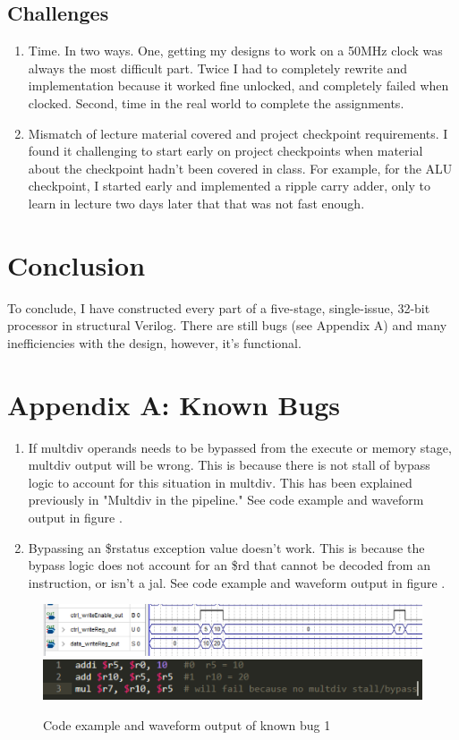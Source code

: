 \documentclass[letterpaper]{article}
\begin{document}
\subsection{Challenges}
\begin{enumerate}
    \item Time. In two ways. One, getting my designs to work on a 50MHz clock was always the most difficult part. Twice I had to completely rewrite and implementation because it worked fine unlocked, and completely failed when clocked. Second, time in the real world to complete the assignments.
    \item Mismatch of lecture material covered and project checkpoint requirements. I found it challenging to start early on project checkpoints when material about the checkpoint hadn't been covered in class. For example, for the ALU checkpoint, I started early and implemented a ripple carry adder, only to learn in lecture two days later that that was not fast enough.
\end{enumerate}

\section{Conclusion}
To conclude, I have constructed every part of a five-stage, single-issue, 32-bit processor in structural Verilog. There are still bugs (see Appendix A) and many inefficiencies with the design, however, it's functional.

\clearpage

\section{Appendix A: Known Bugs}
\begin{enumerate}
    \item If multdiv operands needs to be bypassed from the execute or memory stage, multdiv output will be wrong. This is because there is not stall of bypass logic to account for this situation in multdiv. This has been explained previously in "Multdiv in the pipeline." See code example and waveform output in figure .
    \item Bypassing an \$rstatus exception value doesn't work. This is because the bypass logic does not account for an \$rd that cannot be decoded from an instruction, or isn't a jal. See code example and waveform output in figure .
\end{enumerate}

\begin{figure}[h]
    \centering
    \includegraphics[width=\textwidth]{multdivnobypass.png}
    \includegraphics[width=\textwidth]{multdivnobypass_code.png}
    \caption{Code example and waveform output of known bug 1}
    \label{fig:my_label}
\end{figure}
\end{document}
